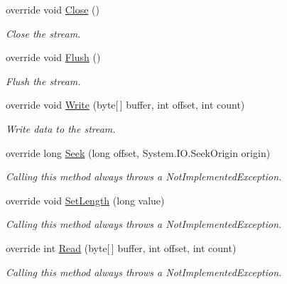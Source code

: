 \begin{DoxyCompactItemize}
override void \mbox{\hyperlink{class_super_tiled2_unity_1_1_ionic_1_1_b_zip2_1_1_parallel_b_zip2_output_stream_a87fe688f8fabd556a7f5a5e0ed3aaf2d}{Close}} ()
\begin{DoxyCompactList}\small\item\em Close the stream. \end{DoxyCompactList}\item 
override void \mbox{\hyperlink{class_super_tiled2_unity_1_1_ionic_1_1_b_zip2_1_1_parallel_b_zip2_output_stream_a922183ef483b356f632b3239cfd61cbd}{Flush}} ()
\begin{DoxyCompactList}\small\item\em Flush the stream. \end{DoxyCompactList}\item 
override void \mbox{\hyperlink{class_super_tiled2_unity_1_1_ionic_1_1_b_zip2_1_1_parallel_b_zip2_output_stream_a35ba7da75cc82ea269449f9497e3e148}{Write}} (byte\mbox{[}$\,$\mbox{]} buffer, int offset, int count)
\begin{DoxyCompactList}\small\item\em Write data to the stream. \end{DoxyCompactList}\item 
override long \mbox{\hyperlink{class_super_tiled2_unity_1_1_ionic_1_1_b_zip2_1_1_parallel_b_zip2_output_stream_a2bc0ebcbdea44c797bce9b241c031f9c}{Seek}} (long offset, System.\+I\+O.\+Seek\+Origin origin)
\begin{DoxyCompactList}\small\item\em Calling this method always throws a Not\+Implemented\+Exception. \end{DoxyCompactList}\item 
override void \mbox{\hyperlink{class_super_tiled2_unity_1_1_ionic_1_1_b_zip2_1_1_parallel_b_zip2_output_stream_a7cea59ceac611f61faed6a94be94dd0a}{Set\+Length}} (long value)
\begin{DoxyCompactList}\small\item\em Calling this method always throws a Not\+Implemented\+Exception. \end{DoxyCompactList}\item 
override int \mbox{\hyperlink{class_super_tiled2_unity_1_1_ionic_1_1_b_zip2_1_1_parallel_b_zip2_output_stream_a40117f23d13b05b6624de03ef4a2fc0c}{Read}} (byte\mbox{[}$\,$\mbox{]} buffer, int offset, int count)
\begin{DoxyCompactList}\small\item\em Calling this method always throws a Not\+Implemented\+Exception. \end{DoxyCompactList}\end{DoxyCompactItemize}
